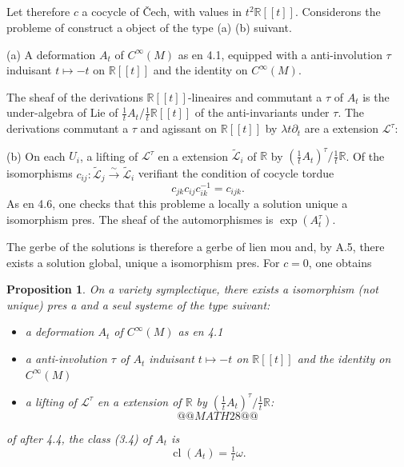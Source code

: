 \documentclass[11pt,a4paper]{article}
\theoremstyle{plain}
\newtheorem{proposition}[theorem]{Proposition}
\theoremstyle{definition}
\DeclareMathOperator{\cl}{cl}
\newcommand{\R}{\mathbb{R}}
\newcommand{\iso}{\xrightarrow{\sim}}
\begin{document}
\subsection{}
Let therefore $c$ a cocycle of \v{C}ech, with values in $t^{2}\R[[t]]$. Considerons the probleme of construct a object of the type (a) (b) suivant.

(a) A deformation $A_{t}$ of $C^{\infty}(M)$ as en 4.1, equipped with a anti-involution $\tau$ induisant $t \mapsto -t$ on $\R[[t]]$ and the identity on $C^{\infty}(M)$.

The sheaf of the derivations $\R[[t]]$-lineaires and commutant a $\tau$ of $A_{t}$ is the under-algebra of Lie of $\tfrac{1}{t}A_{t}/\tfrac{1}{t}\R[[t]]$ of the anti-invariants under $\tau$. The derivations commutant a $\tau$ and agissant on $\R[[t]]$ by $\lambda t\partial_{t}$ are a extension $\mathcal{L}^{\tau}$:

(b) On each $U_{i}$, a lifting of $\mathcal{L}^{\tau}$ en a extension $\widetilde{\mathcal{L}}_{i}$ of $\R$ by $(\tfrac{1}{t}A_{t})^{\tau}/\tfrac{1}{t}\R$. Of the isomorphisms $c_{ij}: \widetilde{\mathcal{L}}_{j} \iso \widetilde{\mathcal{L}}_{i}$ verifiant the condition of cocycle tordue
\[
c_{jk} c_{ij} c_{ik}^{-1} = c_{ijk}.
\]
As en 4.6, one checks that this probleme a locally a solution unique a isomorphism pres. The sheaf of the automorphismes is $\exp(A_{t}^{\tau})$.

The gerbe of the solutions is therefore a gerbe of lien mou and, by A.5, there exists a solution global, unique a isomorphism pres.
For $c = 0$, one obtains

\begin{proposition}
On a variety symplectique, there exists a isomorphism (not unique) pres a and a seul systeme of the type suivant:
\begin{itemize}
\item[(a)] a deformation $A_{t}$ of $C^{\infty}(M)$ as en 4.1
\item[(b)] a anti-involution $\tau$ of $A_{t}$ induisant $t \mapsto -t$ on $\R[[t]]$ and the identity on $C^{\infty}(M)$
\item[(c)] a lifting of $\mathcal{L}^{\tau}$ en a extension of $\R$ by $(\tfrac{1}{t}A_{t})^{\tau}/\tfrac{1}{t}\R$:
\[
@@MATH28@@
\]
\end{itemize}
of after 4.4, the class (3.4) of $A_{t}$ is
\begin{equation}
\cl(A_{t}) = \tfrac{1}{t}\omega. \tag{4.12.1}
\end{equation}
\end{proposition}
\end{document}
